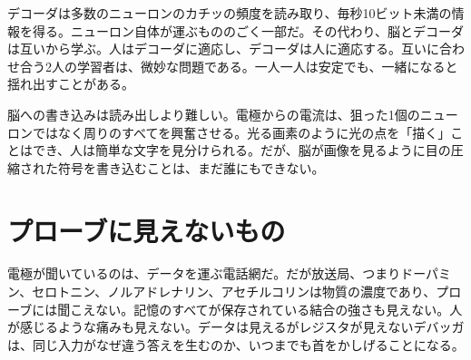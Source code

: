 デコーダは多数のニューロンのカチッの頻度を読み取り、毎秒10ビット未満の情報を得る。ニューロン自体が運ぶもののごく一部だ。その代わり、脳とデコーダは互いから学ぶ。人はデコーダに適応し、デコーダは人に適応する。互いに合わせ合う2人の学習者は、微妙な問題である。一人一人は安定でも、一緒になると揺れ出すことがある。

脳への書き込みは読み出しより難しい。電極からの電流は、狙った1個のニューロンではなく周りのすべてを興奮させる。光る画素のように光の点を「描く」ことはでき、人は簡単な文字を見分けられる。だが、脳が画像を見るように目の圧縮された符号を書き込むことは、まだ誰にもできない。

\section*{プローブに見えないもの}

電極が聞いているのは、データを運ぶ電話網だ。だが放送局、つまりドーパミン、セロトニン、ノルアドレナリン、アセチルコリンは物質の濃度であり、プローブには聞こえない。記憶のすべてが保存されている結合の強さも見えない。人が感じるような痛みも見えない。データは見えるがレジスタが見えないデバッガは、同じ入力がなぜ違う答えを生むのか、いつまでも首をかしげることになる。


